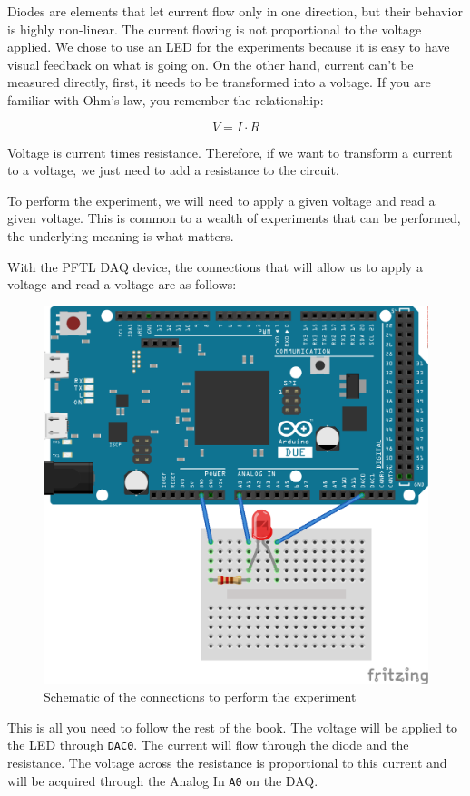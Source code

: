 Diodes are elements that let current flow only in one direction, but their behavior is highly non-linear. The current flowing is not proportional to the voltage applied. We chose to use an LED for the experiments because it is easy to have visual feedback on what is going on. On the other hand, current can't be measured directly, first, it needs to be transformed into a voltage. If you are familiar with Ohm's law, you remember the relationship:

\begin{equation}
V = I \cdot R
\end{equation}

Voltage is current times resistance. Therefore, if we want to transform a current to a voltage, we just need to add a resistance to the circuit.

To perform the experiment, we will need to apply a given voltage and read a given voltage. This is common to a wealth of experiments that can be performed, the underlying meaning is what matters.

With the {PFTL DAQ} device, the connections that will allow us to apply a voltage and read a voltage are as follows:

\begin{figure}
\includegraphics[width=.5\textwidth]{images/Chapter_03/IV_scheme_bb.png}
\caption{Schematic of the connections to perform the experiment}
\end{figure}

This is all you need to follow the rest of the book. The voltage will be applied to the LED through \texttt{DAC0}. The current will flow through the diode and the resistance. The voltage across the resistance is proportional to this current and will be acquired through the Analog In \texttt{A0} on the DAQ.


